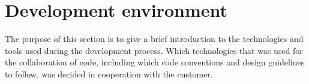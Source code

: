 \newpage
\section{Development environment}

The purpose of this section is to give a brief introduction to the technologies and tools used during the development process. Which technologies that was used for the collaboration of code, including which code conventions and design guidelines to follow, was decided in cooperation with the customer.





